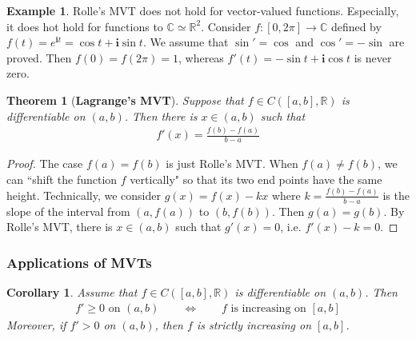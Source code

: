 \documentclass[12pt,b5paper,notitlepage]{article}
\theoremstyle{definition}
\newtheorem{eg}[df]{Example}
\theoremstyle{plain}
\newtheorem{thm}[df]{Theorem}
\newtheorem{co}[df]{Corollary}
\newcommand{\im}{\mathbf{i}}
\newcommand{\Cbb}{\mathbb C}
\newcommand{\Rbb}{\mathbb R}
\numberwithin{equation}{section}
\begin{document}
\begin{eg}
Rolle's MVT does not hold for vector-valued functions. Especially, it does hot hold for functions to $\Cbb\simeq\Rbb^2$. Consider $f:[0,2\pi]\rightarrow\Cbb$ defined by $f(t)=e^{\im t}=\cos t+\im\sin t$. We assume that $\sin'=\cos$ and $\cos'=-\sin$ are proved. Then $f(0)=f(2\pi)=1$, whereas $f'(t)=-\sin t+\im\cos t$ is never zero.
\end{eg}





\begin{thm}[\textbf{Lagrange's MVT}] \label{lb345}
Suppose that $f\in C([a,b],\Rbb)$ is differentiable on $(a,b)$. Then there is $x\in(a,b)$ such that
\begin{align}\label{eq113}
f'(x)=\frac{f(b)-f(a)}{b-a}
\end{align}
\end{thm}



\begin{proof}
The case $f(a)=f(b)$ is just Rolle's MVT. When $f(a)\neq f(b)$, we can ``shift the function $f$ vertically" so that its two end points have the same height. Technically, we consider $g(x)=f(x)-kx$ where $k=\frac{f(b)-f(a)}{b-a}$ is the slope of the interval from $(a,f(a))$ to $(b,f(b))$. Then $g(a)=g(b)$. By Rolle's MVT, there is $x\in(a,b)$ such that $g'(x)=0$, i.e. $f'(x)-k=0$.
\end{proof}


\subsubsection{Applications of MVTs}








\begin{co}\label{lb330}
Assume that $f\in C([a,b],\Rbb)$ is differentiable on $(a,b)$. Then
\begin{align}
f'\geq0\text{ on }(a,b)\qquad\Longleftrightarrow\qquad f\text{ is increasing on }[a,b] \label{eq114}
\end{align}
Moreover, if $f'>0$ on $(a,b)$, then $f$ is strictly increasing on $[a,b]$.
\end{co}
\end{document}
